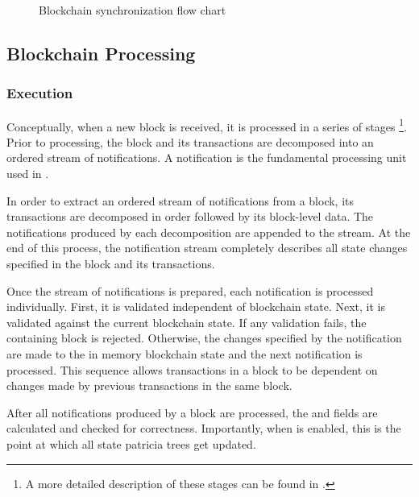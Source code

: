 \begin{figure}[H]
	\begin{center}
		
		\caption{Blockchain synchronization flow chart\label{fig:blockchain:synchronizationFlowChart}}
	\end{center}
\end{figure}

\subsection{Blockchain Processing}

\subsubsection*{Execution}

Conceptually, when a new block is received, it is processed in a series of stages
\footnote{A more detailed description of these stages can be found in .}.
Prior to processing, the block and its transactions are decomposed into an ordered stream of notifications.
A notification is the fundamental processing unit used in \codename.

In order to extract an ordered stream of notifications from a block, its transactions are decomposed in order followed by its block-level data.
The notifications produced by each decomposition are appended to the stream.
At the end of this process, the notification stream completely describes all state changes specified in the block and its transactions.

Once the stream of notifications is prepared, each notification is processed individually.
First, it is validated independent of blockchain state.
Next, it is validated against the current blockchain state.
If any validation fails, the containing block is rejected.
Otherwise, the changes specified by the notification are made to the in memory blockchain state and the next notification is processed.
This sequence allows transactions in a block to be dependent on changes made by previous transactions in the same block.

After all notifications produced by a block are processed, the   and   fields are calculated and checked for correctness.
Importantly, when  is enabled, this is the point at which all state patricia trees get updated.

